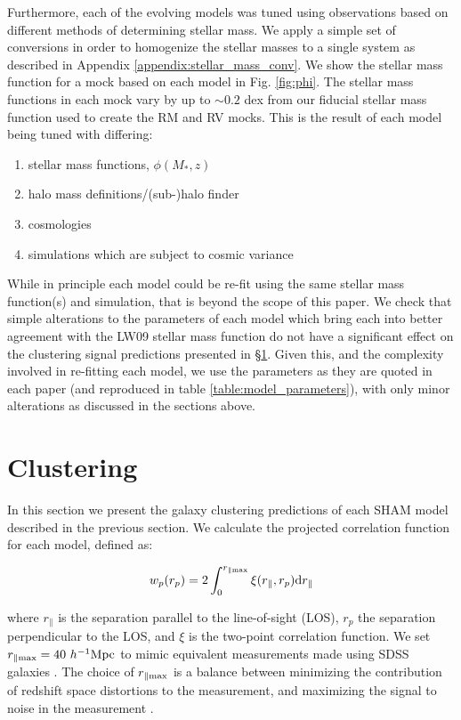 \documentclass[a4paper,fleqn,usenatbib]{mnras}
\begin{document}
Furthermore, each of the evolving models was tuned using observations based on different methods of determining stellar mass.  We apply a simple set of conversions in order to homogenize the stellar masses to a single system as described in Appendix \ref{appendix:stellar_mass_conv}.   We show the stellar mass function for a mock based on each model in Fig. \ref{fig:phi}.  The stellar mass functions in each mock vary by up to $\sim 0.2$ dex from our fiducial stellar mass function used to create the RM and RV mocks.  This is the result of each model being tuned with differing:
\begin{enumerate}
\item stellar mass functions, $\phi(M_*,z)$
\item halo mass definitions/(sub-)halo finder
\item cosmologies
\item simulations which are subject to cosmic variance
\end{enumerate}
While in principle each model could be re-fit using the same stellar mass function(s) and simulation, that is beyond the scope of this paper.  We check that simple alterations to the parameters of each model which bring each into better agreement with the LW09 stellar mass function do not have a significant effect on the clustering signal predictions presented in \S \ref{sec:clustering}.  Given this, and the complexity involved in re-fitting each model, we use the parameters as they are quoted in each paper (and reproduced in table \ref{table:model_parameters}), with only minor alterations as discussed in the sections above.  


\section{Clustering}
\label{sec:clustering}

In this section we present the galaxy clustering predictions of each SHAM model described in the previous section.  We calculate the projected correlation function for each model, defined as:
%
\begin{linenomath}
\begin{equation}
w_p(r_p) = 2\int_0^{r_{\parallel \rm max}}\xi(r_{\parallel},r_p)\mathrm{d}r_{\parallel}
\end{equation}
\end{linenomath}
%
where $r_{\parallel}$ is the separation parallel to the line-of-sight (LOS), $r_{p}$ the separation perpendicular to the LOS, and $\xi$ is the two-point correlation function.  We set $r_{\parallel \rm max} = 40~{h^{-1}\rm Mpc}$ to mimic equivalent measurements made using SDSS galaxies \citep{Yang:2012ew}.  The choice of $r_{\parallel \rm max}$ is a balance between minimizing the contribution of redshift space distortions to the measurement, and maximizing the signal to noise in the measurement \citep{Padmanabhan:2007kn, vandenBosch:2013jf}.
\end{document}
